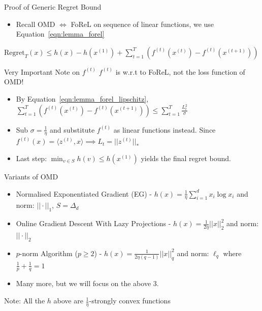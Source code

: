 \begin{frame}{Proof of Generic Regret Bound}
    \begin{itemize}
        \item Recall OMD $\iff$ FoReL on sequence of linear functions, we use Equation~\ref{eqn:lemma_forel}
    \end{itemize}
    $\text{Regret}_T(x) \leq h(x) - h(x^{(1)}) + \sum_{t=1}^T (f^{(t)}(x^{(t)}) - f^{(t)}(x^{(t+1)}))$
    \begin{alertblock}{Very Important Note on $f^{(t)}$}
        $f^{(t)}$ is w.r.t to FoReL, not the loss function of OMD!
    \end{alertblock}
    
    \begin{itemize}
        \item By Equation~\ref{eqn:lemma_forel_lipschitz}, $\sum_{t=1}^T (f^{(t)}(x^{(t)}) - f^{(t)}(x^{(t+1)})) \leq \sum_{t=1}^T \frac{L_t^2}{\sigma}$
        \item Sub $\sigma= \frac{1}{\eta}$ and substitute $f^{(t)}$ as linear functions instead. Since $f^{(t)}(x) = \langle z^{(t)}, x\rangle \implies L_t = ||z^{(t)}||_*$
        \item Last step: $\min_{v \in S} h(v) \leq h(x^{(1)})$ yields the final regret bound.
    \end{itemize}
\end{frame}

\begin{frame}{Variants of OMD}
    \begin{itemize}
        \item Normalised Exponentiated Gradient (EG) - $h(x) = \frac{1}{\eta}\sum_{i=1}^d x_i \log x_i$ and norm: $||\cdot||_1$, $S = \Delta_d$
        \item Online Gradient Descent With Lazy Projections - $h(x) = \frac{1}{2\eta}||x||_2^2$ and norm: $||\cdot||_2$
        \item $p$-norm Algorithm ($p\geq 2$) - \newline$h(x) = \frac{1}{2\eta(q-1)}||x||_q^2$ and norm: $\ell_q$ where $\frac{1}{p} + \frac{1}{q} = 1$
        \item Many more, but we will focus on the above 3.
    \end{itemize}
    Note: All the $h$ above are $\frac{1}{\eta}$-strongly convex functions
\end{frame}

